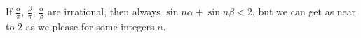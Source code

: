 If $\frac{\alpha}{\pi}$, $\frac{\beta}{\pi}$, $\frac{\alpha}{\beta}$ are irrational, then always $\sin n\alpha + \sin n\beta < 2$, but we can get as near to $2$ as we please for some integers $n$.

